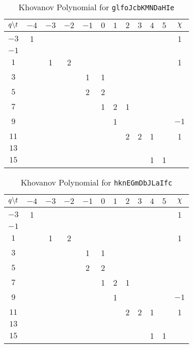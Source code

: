 \documentclass{article}
\theoremstyle{plain}
\begin{document}
        \begin{table}
            \centering
            \begin{tabular}{| c | c | c | c | c | c | c | c | c | c | c | c |}
                \hline
                $q\symbol{92}t$&$-4$&$-3$&$-2$&$-1$&$0$&$1$&$2$&$3$&$4$&$5$&$\chi$\\
                \hline
                $-3$&1&&&&&&&&&&1\\
                \hline
                $-1$&&&&&&&&&&&\\
                \hline
                $1$&&1&2&&&&&&&&1\\
                \hline
                $3$&&&&1&1&&&&&&\\
                \hline
                $5$&&&&2&2&&&&&&\\
                \hline
                $7$&&&&&1&2&1&&&&\\
                \hline
                $9$&&&&&&1&&&&&$-1$\\
                \hline
                $11$&&&&&&&2&2&1&&1\\
                \hline
                $13$&&&&&&&&&&&\\
                \hline
                $15$&&&&&&&&&1&1&\\
                \hline
            \end{tabular}
            \caption{Khovanov Polynomial for \texttt{glfoJcbKMNDaHIe}}
        \end{table}
        \begin{table}
            \centering
            \begin{tabular}{| c | c | c | c | c | c | c | c | c | c | c | c |}
                \hline
                $q\symbol{92}t$&$-4$&$-3$&$-2$&$-1$&$0$&$1$&$2$&$3$&$4$&$5$&$\chi$\\
                \hline
                $-3$&1&&&&&&&&&&1\\
                \hline
                $-1$&&&&&&&&&&&\\
                \hline
                $1$&&1&2&&&&&&&&1\\
                \hline
                $3$&&&&1&1&&&&&&\\
                \hline
                $5$&&&&2&2&&&&&&\\
                \hline
                $7$&&&&&1&2&1&&&&\\
                \hline
                $9$&&&&&&1&&&&&$-1$\\
                \hline
                $11$&&&&&&&2&2&1&&1\\
                \hline
                $13$&&&&&&&&&&&\\
                \hline
                $15$&&&&&&&&&1&1&\\
                \hline
            \end{tabular}
            \caption{Khovanov Polynomial for \texttt{hknEGmDbJLaIfc}}
        \end{table}
\end{document}
